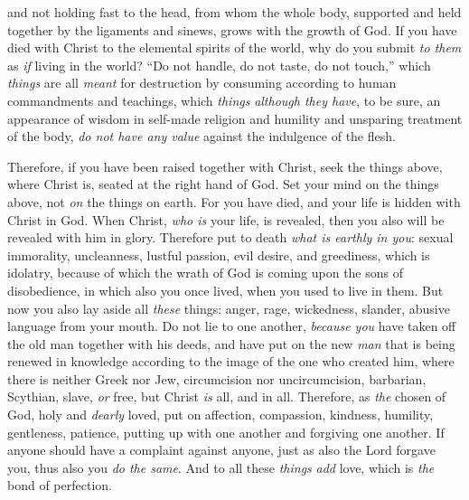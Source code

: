 \begin{biblechapter}
\verse and not holding fast to the head, from whom the whole body, supported and held together by the ligaments and sinews, grows with the growth of God.
\verse If you have died with Christ to the elemental spirits of the world, why do you submit \textit{to them} as \textit{if} living in the world?
\verse “Do not handle, do not taste, do not touch,”
\verse which \textit{things} are all \textit{meant} for destruction by consuming according to human commandments and teachings,
\verse which \textit{things} \textit{although they have}, to be sure, an appearance of wisdom in self-made religion and humility and unsparing treatment of the body, \textit{do not have any value} against the indulgence of the flesh.
\end{biblechapter}

\begin{biblechapter} %
 Therefore, if you have been raised together with Christ, seek the things above, where Christ is, seated at the right hand of God.
\verse Set your mind on the things above, not \textit{on} the things on earth.
\verse For you have died, and your life is hidden with Christ in God.
\verse When Christ, \textit{who is} your life, is revealed, then you also will be revealed with him in glory.
 Therefore put to death \textit{what is earthly in you}: sexual immorality, uncleanness, lustful passion, evil desire, and greediness, which is idolatry,
\verse because of which the wrath of God is coming upon the sons of disobedience,
\verse in which also you once lived, when you used to live in them.
\verse But now you also lay aside all \textit{these} things: anger, rage, wickedness, slander, abusive language from your mouth.
\verse Do not lie to one another, \textit{because you} have taken off the old man together with his deeds,
\verse and have put on the new \textit{man} that is being renewed in knowledge according to the image of the one who created him,
\verse where there is neither Greek nor Jew, circumcision nor uncircumcision, barbarian, Scythian, slave, \textit{or} free, but Christ \textit{is} all, and in all.
 Therefore, as \textit{the} chosen of God, holy and \textit{dearly} loved, put on affection, compassion, kindness, humility, gentleness, patience,
\verse putting up with one another and forgiving one another. If anyone should have a complaint against anyone, just as also the Lord forgave you, thus also you \textit{do the same}.
\verse And to all these \textit{things} \textit{add} love, which is \textit{the} bond of perfection.

\end{biblechapter}
